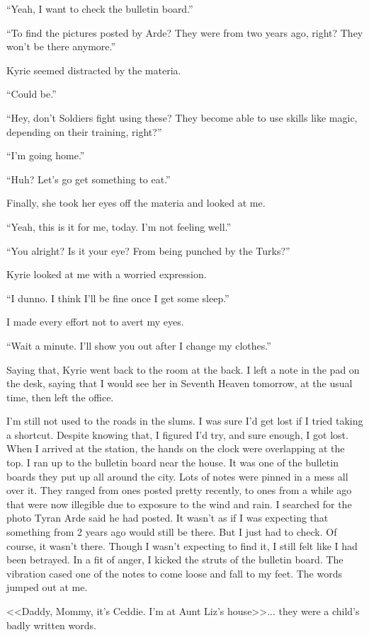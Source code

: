 \documentclass[oneside]{book}
\begin{document}
“Yeah, I want to check the bulletin board.”

“To find the pictures posted by Arde? They were from two years ago, right? They won’t be there anymore.”

Kyrie seemed distracted by the materia.

“Could be.”

“Hey, don’t Soldiers fight using these? They become able to use skills like magic, depending on their training, right?”

“I’m going home.”

“Huh? Let’s go get something to eat.”

Finally, she took her eyes off the materia and looked at me.

“Yeah, this is it for me, today. I’m not feeling well.”

“You alright? Is it your eye? From being punched by the Turks?”

Kyrie looked at me with a worried expression.

“I dunno. I think I’ll be fine once I get some sleep.”

I made every effort not to avert my eyes.

“Wait a minute. I’ll show you out after I change my clothes.”

Saying that, Kyrie went back to the room at the back. I left a note in the pad on the desk, saying that I would see her in Seventh Heaven tomorrow, at the usual time, then left the office.

I’m still not used to the roads in the slums. I was sure I’d get lost if I tried taking a shortcut. Despite knowing that, I figured I’d try, and sure enough, I got lost. When I arrived at the station, the hands on the clock were overlapping at the top. I ran up to the bulletin board near the house. It was one of the bulletin boards they put up all around the city. Lots of notes were pinned in a mess all over it. They ranged from ones posted pretty recently, to ones from a while ago that were now illegible due to exposure to the wind and rain. I searched for the photo Tyran Arde said he had posted. It wasn’t as if I was expecting that something from 2 years ago would still be there. But I just had to check. Of course, it wasn’t there. Though I wasn’t expecting to find it, I still felt like I had been betrayed. In a fit of anger, I kicked the struts of the bulletin board. The vibration cased one of the notes to come loose and fall to my feet. The words jumped out at me.

<<Daddy, Mommy, it’s Ceddie. I’m  at  Aunt Liz’s house>>... they were a child’s badly written words.
\end{document}
